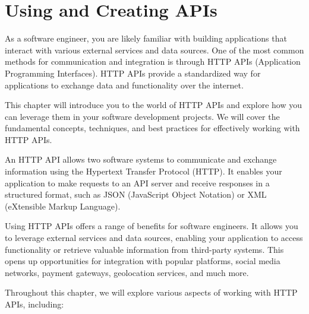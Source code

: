 \chapter{Using and Creating APIs}

As a software engineer, you are likely familiar with building
applications that interact with various external services and data
sources. One of the most common methods for communication and
integration is through HTTP APIs (Application Programming
Interfaces). HTTP APIs provide a standardized way for applications to
exchange data and functionality over the internet. 

This chapter will introduce you to the world of HTTP APIs and explore
how you can leverage them in your software development projects. We
will cover the fundamental concepts, techniques, and best practices
for effectively working with HTTP APIs.

An HTTP API allows two software systems to communicate and exchange
information using the Hypertext Transfer Protocol (HTTP). It enables
your application to make requests to an API server and receive
responses in a structured format, such as JSON (JavaScript Object
Notation) or XML (eXtensible Markup Language).

Using HTTP APIs offers a range of benefits for software engineers. It
allows you to leverage external services and data sources, enabling
your application to access functionality or retrieve valuable
information from third-party systems. This opens up opportunities for
integration with popular platforms, social media networks, payment
gateways, geolocation services, and much more.

Throughout this chapter, we will explore various aspects of working
with HTTP APIs, including:

